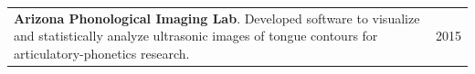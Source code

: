 \documentclass{resume} %
\begin{document}


\begin{tabular}{@{}p{}p{}@{}}
  {\bf Arizona Phonological Imaging Lab}.
   Developed software to visualize and statistically analyze ultrasonic images of tongue contours for articulatory-phonetics research.
   &
   {2015}
\end{tabular}


\end{document}
